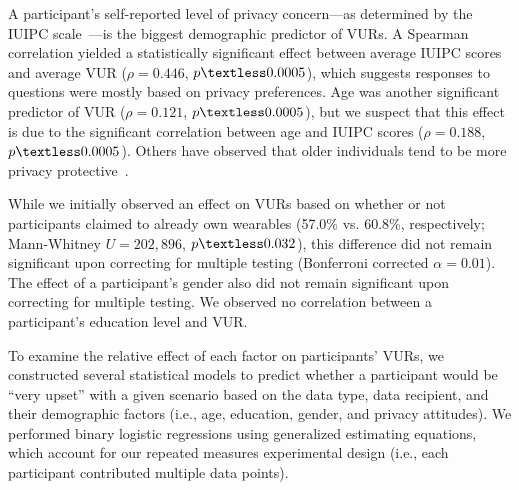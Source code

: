 \documentclass[conference]{IEEEtran}
\begin{document}
A participant's self-reported level of privacy concern---as determined by the IUIPC scale~\cite{malhotra2004internet}---is the biggest demographic predictor of VURs. A Spearman correlation yielded a statistically significant effect between average IUIPC scores and average VUR ($\rho=0.446$, $p\textless0.0005$), which suggests responses to questions were mostly based on privacy preferences. Age was another significant predictor of VUR ($\rho=0.121$, $p\textless0.0005$), but we suspect that this effect is due to the significant correlation between age and IUIPC scores ($\rho=0.188$, $p\textless0.0005$). Others have observed that older individuals tend to be more privacy protective~\cite{varian2005demographics}.

While we initially observed an effect on VURs based on whether or not participants claimed to already own wearables (57.0\% vs. 60.8\%, respectively; Mann-Whitney $U=202,896$, $p\textless0.032$), this difference did not remain significant upon correcting for multiple testing (Bonferroni corrected $\alpha=0.01$). The effect of a participant's gender also did not remain significant upon correcting for multiple testing. We observed no correlation between a participant's education level and VUR.

\label{sec:regression}
To examine the relative effect of each factor on participants' VURs, we constructed several statistical models to predict whether a participant would be ``very upset'' with a given scenario based on the data type, data recipient, and their demographic factors (i.e., age, education, gender, and privacy attitudes). We performed binary logistic regressions using generalized estimating equations, which account for our repeated measures experimental design (i.e., each participant contributed multiple data points).
\end{document}

